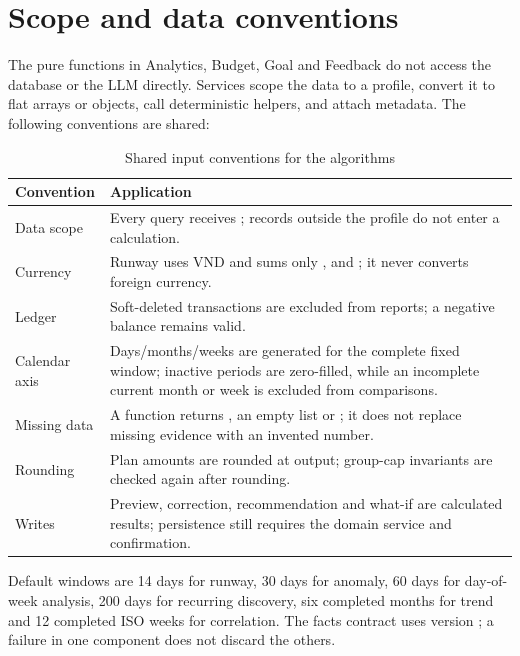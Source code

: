 \section{Scope and data conventions}
\label{app:algorithm-conventions}

The pure functions in Analytics, Budget, Goal and Feedback do not access the database or the LLM directly. Services scope the data to a profile, convert it to flat arrays or objects, call deterministic helpers, and attach metadata. The following conventions are shared:

\begin{table}[H]
  \centering
  \caption{Shared input conventions for the algorithms}
  \label{tab:app-conventions}
  \begin{tabularx}{\textwidth}{@{}L{3.7cm}Y@{}}
    \toprule
    \textbf{Convention} & \textbf{Application} \\
    \midrule
    Data scope & Every query receives ; records outside the profile do not enter a calculation. \\
    Currency & Runway uses VND and sums only ,  and ; it never converts foreign currency. \\
    Ledger & Soft-deleted transactions are excluded from reports; a negative balance remains valid. \\
    Calendar axis & Days/months/weeks are generated for the complete fixed window; inactive periods are zero-filled, while an incomplete current month or week is excluded from comparisons. \\
    Missing data & A function returns , an empty list or ; it does not replace missing evidence with an invented number. \\
    Rounding & Plan amounts are rounded at output; group-cap invariants are checked again after rounding. \\
    Writes & Preview, correction, recommendation and what-if are calculated results; persistence still requires the domain service and confirmation. \\
    \bottomrule
  \end{tabularx}
\end{table}

Default windows are 14 days for runway, 30 days for anomaly, 60 days for day-of-week analysis, 200 days for recurring discovery, six completed months for trend and 12 completed ISO weeks for correlation. The facts contract uses version ; a failure in one component does not discard the others.

